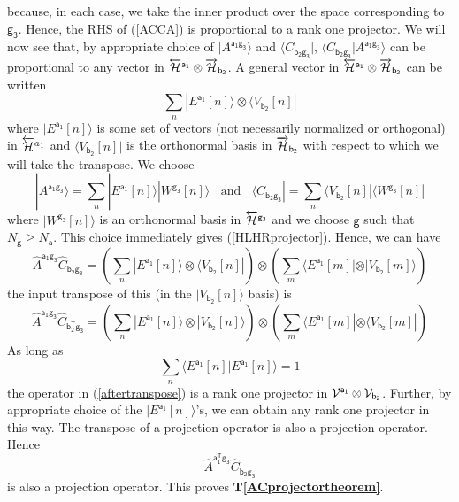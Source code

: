 \documentclass[10pt]{article}
\begin{document}
because, in each case, we take the inner product over the space corresponding to $\mathsf{g_3}$.  Hence, the RHS of (\ref{ACCA}) is proportional to a rank one projector.  We will now see that, by appropriate choice of $|A^\mathsf{a_1g_3}\rangle$ and $\langle C_\mathsf{b_2g_3} |$, $ \langle C_\mathsf{b_2g_3} | A^\mathsf{a_1g_3}\rangle$ can be proportional to any vector in $\overleftarrow{\cal H}^\mathsf{a_1}\otimes \overrightarrow{\cal H}_\mathsf{b_2}$.  A general vector in $\overleftarrow{\cal H}^\mathsf{a_1}\otimes \overrightarrow{\cal H}_\mathsf{b_2}$ can be written
\begin{equation}\label{HLHRprojector}
\sum_n |E^\mathsf{a_1}[n]\rangle \otimes \langle V_\mathsf{b_2}[n] |
\end{equation}
where $|E^\mathsf{a_1}[n]\rangle$ is some set of vectors (not necessarily normalized or orthogonal) in $\overleftarrow{\cal H}^{a_1}$ and $\langle V_\mathsf{b_2}[n]|$ is the orthonormal basis in $\overrightarrow{\cal H}_\mathsf{b_2}$ with respect to which we will take the transpose.  We choose
\begin{equation}
|A^\mathsf{a_1g_3}\rangle = \sum_n |E^\mathsf{a_1}[n]\rangle|W^\mathsf{g_3}[n]\rangle ~~~~\text{and}~~~~
\langle C_\mathsf{b_2g_3}| = \sum_n  \langle V_\mathsf{b_2}[n]|\langle W^\mathsf{g_3}[n]|
\end{equation}
where $|W^\mathsf{g_3}[n]\rangle$ is an orthonormal basis in $\overleftarrow{\cal H}^\mathsf{g_3}$ and we choose $\mathsf g$ such that $N_\mathsf{g} \geq N_\mathsf{a}$.  This choice immediately gives (\ref{HLHRprojector}).  Hence, we can have
\begin{equation}
\hat A^\mathsf{a_1g_3} \hat C_\mathsf{b_2g_3} = \left( \sum_n |E^\mathsf{a_1}[n]\rangle \otimes \langle V_\mathsf{b_2}[n] | \right)\otimes \left(\sum_m  \langle E^\mathsf{a_1}[m]| \otimes | V_\mathsf{b_2}[m] \rangle
\right)
\end{equation}
the input transpose of this (in the $|V_\mathsf{b_2}[n]\rangle$ basis) is
\begin{equation}\label{aftertranspose}
\hat A^\mathsf{a_1g_3} \hat C_\mathsf{b^T_2g_3} = \left( \sum_n |E^\mathsf{a_1}[n]\rangle \otimes | V_\mathsf{b_2}[n] \rangle \right)\otimes \left(\sum_m  \langle E^\mathsf{a_1}[m]| \otimes \langle V_\mathsf{b_2}[m] |\right)
\end{equation}
As long as
\begin{equation}
\sum_n \langle E^\mathsf{a_1}[n]|E^\mathsf{a_1}[n] \rangle =1
\end{equation}
the operator in (\ref{aftertranspose}) is a rank one projector in ${\cal V}^\mathsf{a_1}\otimes{\cal V}_\mathsf{b_2}$.  Further, by appropriate choice of the $|E^\mathsf{a_1}[n] \rangle$'s, we can obtain any rank one projector in this way.  The transpose of a projection operator is also a projection operator.  Hence
\begin{equation}
\hat A^\mathsf{a^T_1g_3} \hat C_\mathsf{b_2g_3}
\end{equation}
is also a projection operator. This proves {\bf T\ref{ACprojectortheorem}}.
\end{document}
